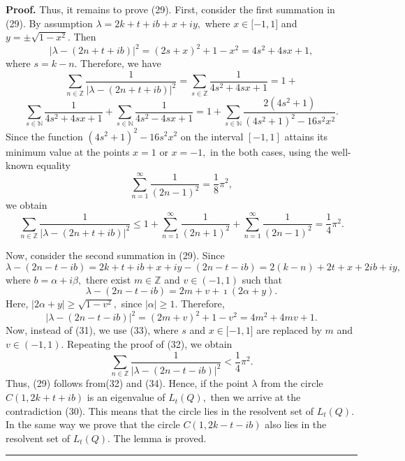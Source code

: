 \documentclass{article}%
\newenvironment{proof}[1][Proof]{\textbf{#1.} }{\ \rule{0.5em}{0.5em}}
\begin{document}
\begin{proof}
Thus, it remains to prove (29). First, consider the first summation in (29).
By assumption $\lambda=2k+t+ib+x+iy,$ where $x\in\lbrack-1,1]$ and $y=\pm
\sqrt{1-x^{2}}.$ Then
\begin{equation}
\left\vert \lambda-(2n+t+ib)\right\vert ^{2}=\left(  2s+x\right)  ^{2}%
+1-x^{2}=4s^{2}+4sx+1, \tag{31}%
\end{equation}
where $s=k-n$. Therefore, we have
\[
\sum_{n\in\mathbb{Z}}\frac{1}{\left\vert \lambda-(2n+t+ib)\right\vert ^{2}%
}=\sum_{s\in\mathbb{Z}}\frac{1}{4s^{2}+4sx+1}=1+
\]%
\[
\sum_{s\in\mathbb{N}}\frac{1}{4s^{2}+4sx+1}+\sum_{s\in\mathbb{N}}\frac
{1}{4s^{2}-4sx+1}=1+\sum_{s\in\mathbb{N}}\frac{2(4s^{2}+1)}{(4s^{2}%
+1)^{2}-16s^{2}x^{2}}.
\]
Since the function $(4s^{2}+1)^{2}-16s^{2}x^{2}$ on the interval $[-1,1]$
attains its minimum value at the points $x=1$ or $x=-1,$ in the both cases,
using the well-known equality
\[
\sum_{n=1}^{\infty}\frac{1}{(2n-1)^{2}}=\frac{1}{8}\pi^{2},
\]
we obtain
\begin{equation}
\sum_{n\in\mathbb{Z}}\frac{1}{\left\vert \lambda-(2n+t+ib)\right\vert ^{2}%
}\leq1+\sum_{n=1}^{\infty}\frac{1}{(2n+1)^{2}}+\sum_{n=1}^{\infty}\frac
{1}{(2n-1)^{2}}=\frac{1}{4}\pi^{2}. \tag{32}%
\end{equation}


Now, consider the second summation in (29). Since%
\[
\lambda-\left(  2n-t-ib\right)  =2k+t+ib+x+iy-\left(  2n-t-ib\right)
=2(k-n)+2t+x+2ib+iy,
\]
where $b=\alpha+i\beta,$ there exist $m\in\mathbb{Z}$ and $v\in(-1,1)$ such
that%
\[
\lambda-\left(  2n-t-ib\right)  =2m+v+\imath(2\alpha+y).
\]
Here, $\left\vert 2\alpha+y\right\vert \geq\sqrt{1-v^{2}},$ since $\left\vert
\alpha\right\vert \geq1.$ Therefore,
\begin{equation}
\left\vert \lambda-(2n-t-ib)\right\vert ^{2}=\left(  2m+v\right)  ^{2}%
+1-v^{2}=4m^{2}+4mv+1. \tag{33}%
\end{equation}
Now, instead of (31), we use (33), where $s$ and $x\in\lbrack-1,1]$ are
replaced by $m$ and $v\in(-1,1).$ Repeating the proof of (32), we obtain
\begin{equation}
\sum_{n\in\mathbb{Z}}\frac{1}{\left\vert \lambda-(2n-t-ib)\right\vert ^{2}%
}<\frac{1}{4}\pi^{2}. \tag{34}%
\end{equation}
Thus, (29) follows from(32) and (34). Hence, if the point $\lambda$ from the
circle $C(1,2k+t+ib)$ is an eigenvalue of $L_{t}(Q),$ then we arrive at the
contradiction (30). This means that the circle lies in the resolvent set of
$L_{t}(Q).$ In the same way we prove that the circle $C(1,2k-t-ib)$ also lies
in the resolvent set of $L_{t}(Q).$ The lemma is proved.
\end{proof}
\end{document}
